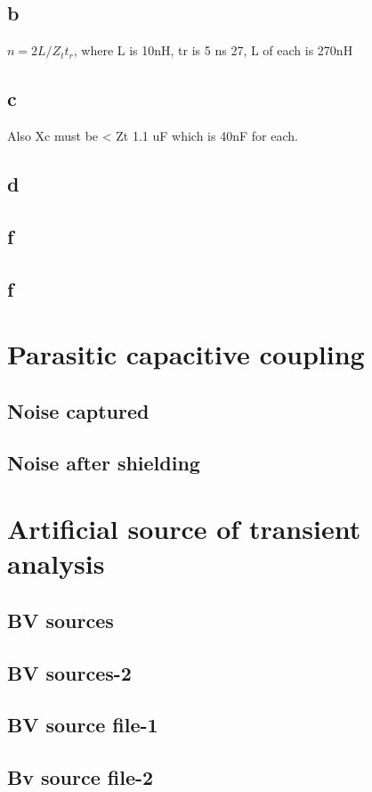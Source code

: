 \documentclass[12pt,a4paper,UKenglish]{article}
\begin{document}
\subsection{b}
$n = 2L/Z_tt_r$, where L is 10nH, tr is 5 ns 27, L of each is 270nH

\subsection{c}
Also Xc must be < Zt 1.1 uF which is 40nF for each.
\subsection{d}
\subsection{f}
\subsection{f}

\section{Parasitic capacitive coupling}
\subsection{Noise captured}
\subsection{Noise after shielding}

\section{Artificial source of transient analysis}
\subsection{BV sources}
\subsection{BV sources-2}
\subsection{BV source file-1}
\subsection{Bv source file-2}
\end{document}
